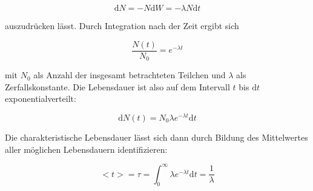 \begin{equation}
    \text{d}N = -N\text{d}W = -\lambda N\text{d}t 
\end{equation}

auszudrücken lässt. Durch Integration nach der Zeit ergibt sich 

\begin{equation}
    \frac{N(t)}{N_0} = e^{-\lambda t}
\end{equation}

mit $N_0$ als Anzahl der insgesamt betrachteten Teilchen und $\lambda$ als Zerfallskonstante. Die Lebensdauer ist also auf dem Intervall $t$ bis $\text{d}t$ exponentialverteilt:

\begin{equation}
    \text{d}N(t) = N_0 \lambda e^{-\lambda t} \text{d}t
\end{equation}

Die charakteristische Lebensdauer lässt sich dann durch Bildung des Mittelwertes aller möglichen Lebensdauern identifizieren: 

\begin{equation*}
    <t> = \tau = \int_0^{\infty} \lambda e^{-\lambda t} \text{d}t = \frac{1}{\lambda}
\end{equation*}